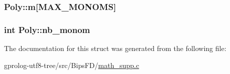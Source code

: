 \subsubsection[{\texorpdfstring{m}{m}}]{ Poly\+::m\mbox{[}{\bf M\+A\+X\+\_\+\+M\+O\+N\+O\+MS}\mbox{]}}\hypertarget{structPoly_a1bae103a920d8182006ef10891c87906}{}\label{structPoly_a1bae103a920d8182006ef10891c87906}
\subsubsection[{\texorpdfstring{nb\+\_\+monom}{nb_monom}}]{\setlength{\rightskip}{0pt plus 5cm}int Poly\+::nb\+\_\+monom}\hypertarget{structPoly_a23949f807fc70dcf7c1b7b18bb48be0c}{}\label{structPoly_a23949f807fc70dcf7c1b7b18bb48be0c}


The documentation for this struct was generated from the following file\+:\begin{DoxyCompactItemize}
\item 
gprolog-\/utf8-\/tree/src/\+Bips\+F\+D/\hyperlink{math__supp_8c}{math\+\_\+supp.\+c}\end{DoxyCompactItemize}
